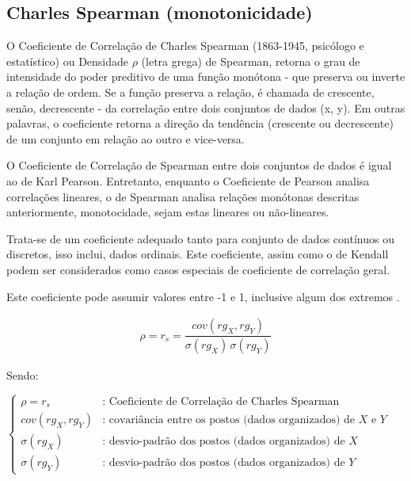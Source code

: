 \subsection{Charles Spearman (monotonicidade)}
		
			O Coeficiente de Correlação de Charles Spearman (1863-1945, psicólogo e estatístico) ou Densidade $ \rho $ (letra grega) de Spearman, retorna o grau de intensidade do poder preditivo de uma função monótona - que preserva ou inverte a relação de ordem. Se a função preserva a relação, é chamada de crescente, senão, decrescente - da correlação entre dois conjuntos de dados (x, y). Em outras palavras, o coeficiente retorna a direção da tendência (crescente ou decrescente) de um conjunto em relação ao outro e vice-versa.
			
			O Coeficiente de Correlação de Spearman entre dois conjuntos de dados é igual ao de Karl Pearson. Entretanto, enquanto o Coeficiente de Pearson analisa correlações lineares, o de Spearman analisa relações monótonas descritas anteriormente, monotocidade, sejam estas lineares ou não-lineares. 
			
			Trata-se de um coeficiente adequado tanto para conjunto de dados contínuos ou discretos, isso inclui, dados ordinais. Este coeficiente, assim como o de Kendall podem ser considerados como casos especiais de coeficiente de correlação geral.
			
			Este coeficiente pode assumir valores entre -1 e 1, inclusive algum dos extremos \cite{ref_spearman}.
					
			\begin{align}
				\rho = r_{s} = \dfrac{cov(rg_{X}, rg_{Y})}{\sigma(rg_{X}) \, \sigma(rg_{Y})}
			\end{align}
			
			Sendo: \newline
			
			$ \begin{cases}
					\rho = r_{s} & \text{: Coeficiente de Correlação de Charles Spearman} \\[6pt]
					cov(rg_{X}, rg_{Y}) & \text{: covariância entre os postos (dados organizados) de $X$ e $Y$} \\[6pt]
					\sigma(rg_{X}) & \text{: desvio-padrão dos postos (dados organizados) de $X$} \\[6pt]
					\sigma(rg_{Y}) & \text{: desvio-padrão dos postos (dados organizados) de $Y$}
				\end{cases} $
